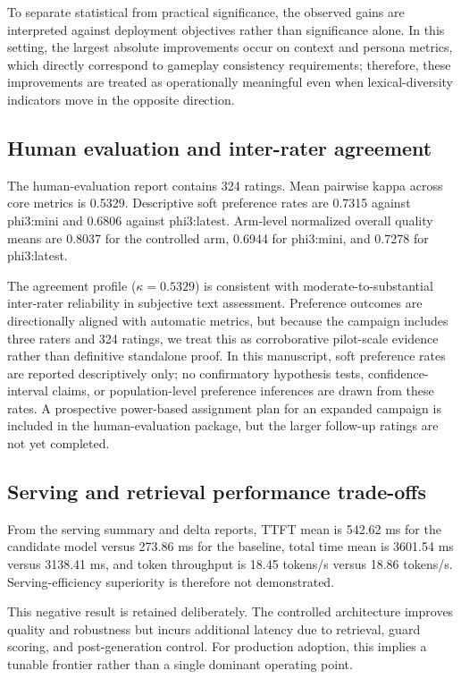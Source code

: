 ﻿\documentclass[a4paper,12pt]{article}
\begin{document}
To separate statistical from practical significance, the observed gains are interpreted against deployment objectives rather than significance alone. In this setting, the largest absolute improvements occur on context and persona metrics, which directly correspond to gameplay consistency requirements; therefore, these improvements are treated as operationally meaningful even when lexical-diversity indicators move in the opposite direction.

\subsection{Human evaluation and inter-rater agreement}
The human-evaluation report contains 324 ratings. Mean pairwise kappa across core metrics is 0.5329. Descriptive soft preference rates are 0.7315 against phi3:mini and 0.6806 against phi3:latest. Arm-level normalized overall quality means are 0.8037 for the controlled arm, 0.6944 for phi3:mini, and 0.7278 for phi3:latest.

The agreement profile (\(\kappa=0.5329\)) is consistent with moderate-to-substantial inter-rater reliability in subjective text assessment. Preference outcomes are directionally aligned with automatic metrics, but because the campaign includes three raters and 324 ratings, we treat this as corroborative pilot-scale evidence rather than definitive standalone proof. In this manuscript, soft preference rates are reported descriptively only; no confirmatory hypothesis tests, confidence-interval claims, or population-level preference inferences are drawn from these rates. A prospective power-based assignment plan for an expanded campaign is included in the human-evaluation package, but the larger follow-up ratings are not yet completed.

\subsection{Serving and retrieval performance trade-offs}

From the serving summary and delta reports, TTFT mean is 542.62 ms for the candidate model versus 273.86 ms for the baseline, total time mean is 3601.54 ms versus 3138.41 ms, and token throughput is 18.45 tokens/s versus 18.86 tokens/s. Serving-efficiency superiority is therefore not demonstrated.

This negative result is retained deliberately. The controlled architecture improves quality and robustness but incurs additional latency due to retrieval, guard scoring, and post-generation control. For production adoption, this implies a tunable frontier rather than a single dominant operating point.
\end{document}
